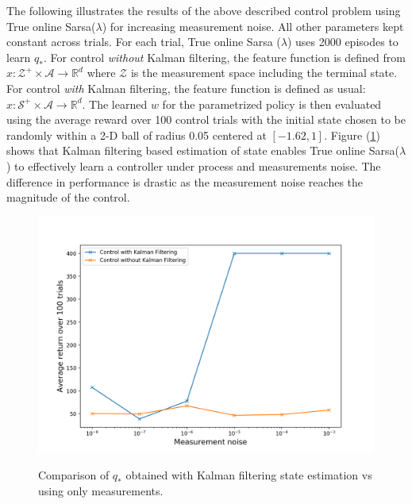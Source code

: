 \documentclass{article}
\begin{document}
The following illustrates the results of the above described control problem using True online Sarsa($\lambda$) for increasing measurement noise. All other parameters kept constant across trials. For each trial, True online Sarsa ($\lambda$) uses 2000 episodes to learn $q_*$. For control \textit{without} Kalman filtering, the feature function is defined from $x : \mathcal{Z}^+ \times \mathcal A \rightarrow \mathbb{R}^d$ where $\mathcal{Z}$ is the measurement space including the terminal state. For control \textit{with} Kalman filtering, the feature function is defined as usual: $x : \mathcal{S}^+ \times \mathcal A \rightarrow \mathbb{R}^d$. The learned $w$ for the parametrized policy is then evaluated using the average reward over 100 control trials with the initial state chosen to be randomly within a 2-D ball of radius 0.05 centered at $[-1.62, 1]$. Figure (\ref{fig:kf_control}) shows that Kalman filtering based estimation of state enables True online Sarsa($\lambda$) to effectively learn a controller under process and measurements noise. The difference in performance is drastic as the measurement noise reaches the magnitude of the control.

\begin{figure}[H]
\includegraphics[scale=0.5]{2d_res.png}
\label{fig:kf_control}
\caption{Comparison of $q_*$ obtained with Kalman filtering state estimation vs using only measurements.}
\end{figure}


 

\end{document}
